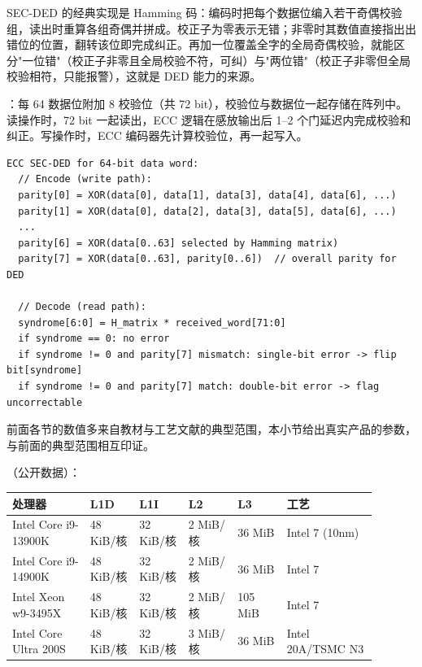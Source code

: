 SEC-DED 的经典实现是 Hamming 码：编码时把每个数据位编入若干奇偶校验组，读出时重算各组奇偶并拼成。校正子为零表示无错；非零时其数值直接指出出错位的位置，翻转该位即完成纠正。再加一位覆盖全字的全局奇偶校验，就能区分"一位错"（校正子非零且全局校验不符，可纠）与"两位错"（校正子非零但全局校验相符，只能报警），这就是 DED 能力的来源。

：每 64 数据位附加 8 校验位（共 72 bit），校验位与数据位一起存储在阵列中。读操作时，72 bit 一起读出，ECC 逻辑在感放输出后 1--2 个门延迟内完成校验和纠正。写操作时，ECC 编码器先计算校验位，再一起写入。

\begin{lstlisting}
ECC SEC-DED for 64-bit data word:
  // Encode (write path):
  parity[0] = XOR(data[0], data[1], data[3], data[4], data[6], ...)
  parity[1] = XOR(data[0], data[2], data[3], data[5], data[6], ...)
  ...
  parity[6] = XOR(data[0..63] selected by Hamming matrix)
  parity[7] = XOR(data[0..63], parity[0..6])  // overall parity for DED

  // Decode (read path):
  syndrome[6:0] = H_matrix * received_word[71:0]
  if syndrome == 0: no error
  if syndrome != 0 and parity[7] mismatch: single-bit error -> flip bit[syndrome]
  if syndrome != 0 and parity[7] match: double-bit error -> flag uncorrectable
\end{lstlisting}


前面各节的数值多来自教材与工艺文献的典型范围，本小节给出真实产品的参数，与前面的典型范围相互印证。

（公开数据）：

\begin{longtable}{L{0.19\linewidth}L{0.12\linewidth}L{0.12\linewidth}L{0.12\linewidth}L{0.12\linewidth}L{0.22\linewidth}}
\toprule
处理器 & L1D & L1I & L2 & L3 & 工艺 \\
\midrule
Intel Core i9-13900K & 48 KiB/核 & 32 KiB/核 & 2 MiB/核 & 36 MiB & Intel 7 (10nm) \\
Intel Core i9-14900K & 48 KiB/核 & 32 KiB/核 & 2 MiB/核 & 36 MiB & Intel 7 \\
Intel Xeon w9-3495X & 48 KiB/核 & 32 KiB/核 & 2 MiB/核 & 105 MiB & Intel 7 \\
Intel Core Ultra 200S & 48 KiB/核 & 32 KiB/核 & 3 MiB/核 & 36 MiB & Intel 20A/TSMC N3 \\
\bottomrule
\end{longtable}

